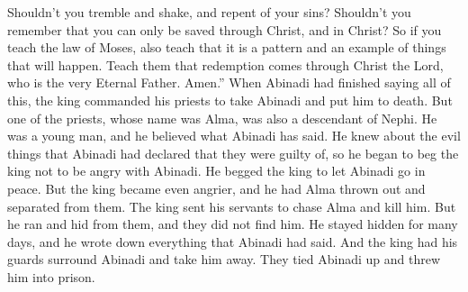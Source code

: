 Shouldn't you tremble and shake, and repent of your sins? Shouldn't you remember that you can only be saved through Christ, and in Christ?
\bverse \iffalse Therefore, if ye teach the law of Moses, also teach that it is a shadow of those things which are to come-- \fi
So if you teach the law of Moses, also teach that it is a pattern and an example of things that will happen.
\bverse \iffalse Teach them that redemption cometh through Christ the Lord, who is the very Eternal Father. Amen. \fi
Teach them that redemption comes through Christ the Lord, who is the very Eternal Father. Amen.''
\bchapter
\bverse \iffalse And now it came to pass that when Abinadi had finished these sayings, that the king commanded that the priests should take him and cause that he should be put to death. \fi
When Abinadi had finished saying all of this, the king commanded his priests to take Abinadi and put him to death.
\bverse \iffalse But there was one among them whose name was Alma, he also being a descendant of Nephi. And he was a young man, and he believed the words which Abinadi had spoken, for he knew concerning the iniquity which Abinadi has testified against them; therefore he began to plead with the king that he would not be angry with Abinadi, but suffer that he might depart in peace. \fi
But one of the priests, whose name was Alma, was also a descendant of Nephi. He was a young man, and he believed what Abinadi has said. He knew about the evil things that Abinadi had declared that they were guilty of, so he began to beg the king not to be angry with Abinadi. He begged the king to let Abinadi go in peace.
\bverse \iffalse But the king was more wroth, and caused that Alma should be cast out from among them, and sent his servants after him that they might slay him. \fi
But the king became even angrier, and he had Alma thrown out and separated from them. The king sent his servants to chase Alma and kill him.
\bverse \iffalse But he fled from before them and hid himself that they found him not. And he being concealed for many days did write all the words which Abinadi had spoken. \fi
But he ran and hid from them, and they did not find him. He stayed hidden for many days, and he wrote down everything that Abinadi had said.
\bverse \iffalse And it came to pass that the king caused that his guards should surround Abinadi and take him; and they bound him and cast him into prison. \fi
And the king had his guards surround Abinadi and take him away. They tied Abinadi up and threw him into prison.

